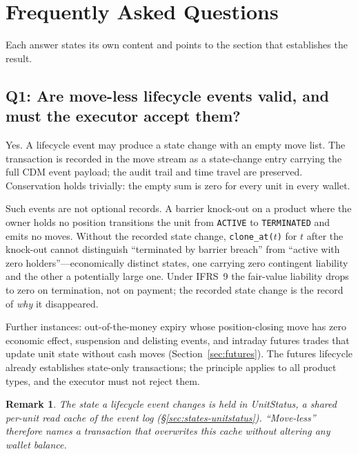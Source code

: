 \documentclass[11pt,a4paper]{article}
\newtheorem{remark}[definition]{Remark}
\begin{document}
\clearpage

\section{Frequently Asked Questions}
\label{sec:faq}

Each answer states its own content and points to the section that establishes the result.

\subsection*{Q1: Are move-less lifecycle events valid, and must the executor accept them?}

Yes. A lifecycle event may produce a state change with an empty move list. The transaction is recorded in the move stream as a state-change entry carrying the full CDM event payload; the audit trail and time travel are preserved. Conservation holds trivially: the empty sum is zero for every unit in every wallet.

Such events are not optional records. A barrier knock-out on a product where the owner holds no position transitions the unit from \texttt{ACTIVE} to \texttt{TERMINATED} and emits no moves. Without the recorded state change, \texttt{clone\_at($t$)} for $t$ after the knock-out cannot distinguish ``terminated by barrier breach'' from ``active with zero holders''---economically distinct states, one carrying zero contingent liability and the other a potentially large one. Under IFRS~9 the fair-value liability drops to zero on termination, not on payment; the recorded state change is the record of \emph{why} it disappeared.

Further instances: out-of-the-money expiry whose position-closing move has zero economic effect, suspension and delisting events, and intraday futures trades that update unit state without cash moves (Section~\ref{sec:futures}). The futures lifecycle already establishes state-only transactions; the principle applies to all product types, and the executor must not reject them.

\begin{remark}
The state a lifecycle event changes is held in UnitStatus, a shared per-unit read cache of the event log (\S\ref{sec:states-unitstatus}). ``Move-less'' therefore names a transaction that overwrites this cache without altering any wallet balance.
\end{remark}
\end{document}
